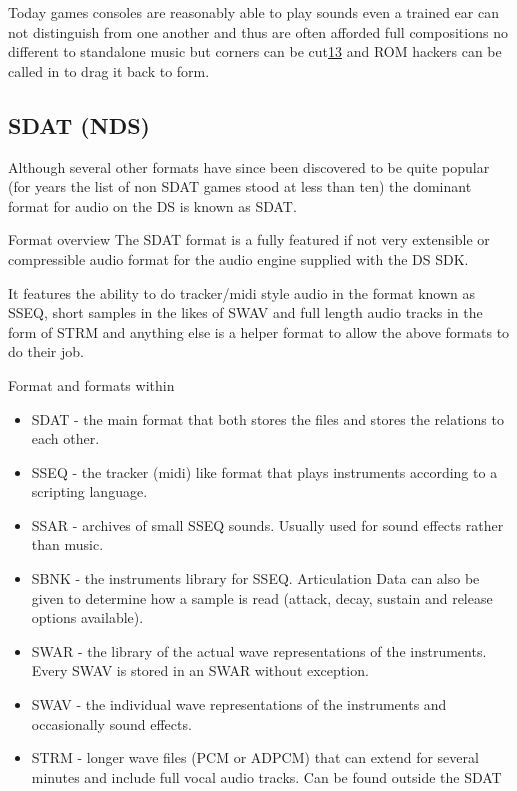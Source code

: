 \documentclass[
]{book}
\providecommand{\tightlist}{%
  \setlength{\itemsep}{0pt}\setlength{\parskip}{0pt}}
\begin{document}
Today games consoles are reasonably able to play sounds even a trained ear can not distinguish from one another and thus are often afforded full compositions no different to standalone music but corners can be cut\href{romhacking202014.html\#fn13x0}{13} and ROM hackers can be called in to drag it back to form.

\hypertarget{sdat-nds}{%
\subsection{SDAT (NDS)}\label{sdat-nds}}

Although several other formats have since been discovered to be quite popular (for years the list of non SDAT games stood at less than ten) the dominant format for audio on the DS is known as SDAT.

Format overview The SDAT format is a fully featured if not very extensible or compressible audio format for the audio engine supplied with the DS SDK.

It features the ability to do tracker/midi style audio in the format known as SSEQ, short samples in the likes of SWAV and full length audio tracks in the form of STRM and anything else is a helper format to allow the above formats to do their job.

Format and formats within

\begin{itemize}
\tightlist
\item
  SDAT - the main format that both stores the files and stores the relations to each other.
\item
  SSEQ - the tracker (midi) like format that plays instruments according to a scripting language.
\item
  SSAR - archives of small SSEQ sounds. Usually used for sound effects rather than music.
\item
  SBNK - the instruments library for SSEQ. Articulation Data can also be given to determine how a sample is read (attack, decay, sustain and release options available).
\item
  SWAR - the library of the actual wave representations of the instruments. Every SWAV is stored in an SWAR without exception.
\item
  SWAV - the individual wave representations of the instruments and occasionally sound effects.
\item
  STRM - longer wave files (PCM or ADPCM) that can extend for several minutes and include full vocal audio tracks. Can be found outside the SDAT
\end{itemize}
\end{document}
